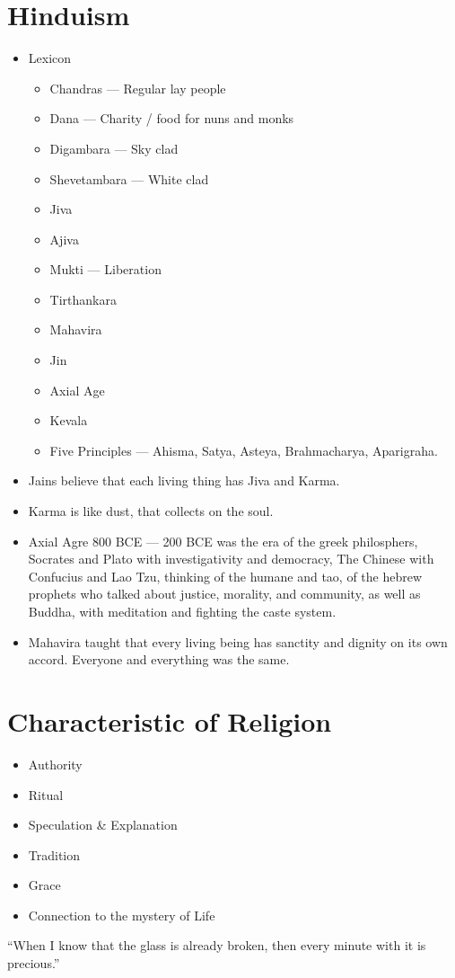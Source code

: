 \documentclass{article}
\begin{document}
\begin{spacing}{1.2}
    \section{Hinduism}
    \begin{itemize}
        \item Lexicon
            \begin{itemize}
                \item Chandras --- Regular lay people
                \item Dana --- Charity / food for nuns and monks
                \item Digambara --- Sky clad
                \item Shevetambara --- White clad
                \item Jiva
                \item Ajiva
                \item Mukti --- Liberation
                \item Tirthankara
                \item Mahavira
                \item Jin
                \item Axial Age
                \item Kevala
                \item Five Principles --- Ahisma, Satya, Asteya, Brahmacharya,
                    Aparigraha.
            \end{itemize}
        \item Jains believe that each living thing has Jiva and Karma.
        \item Karma is like dust, that collects on the soul.
        \item Axial Agre 800 BCE --- 200 BCE was the era of the greek
            philosphers, Socrates and Plato with investigativity and democracy,
            The Chinese with Confucius and Lao Tzu, thinking of the humane and
            tao, of the hebrew prophets who talked about justice, morality, and
            community, as well as Buddha, with meditation and fighting the caste
            system.
        \item Mahavira taught that every living being has sanctity and dignity
            on its own accord. Everyone and everything was the same.
    \end{itemize}
    \section{Characteristic of Religion}
    \begin{itemize}
        \item Authority
        \item Ritual
        \item Speculation \& Explanation
        \item Tradition
        \item Grace
        \item Connection to the mystery of Life
    \end{itemize}
    ``When I know that the glass is already broken, then every minute with it is
    precious.''


\end{spacing}
\end{document}
